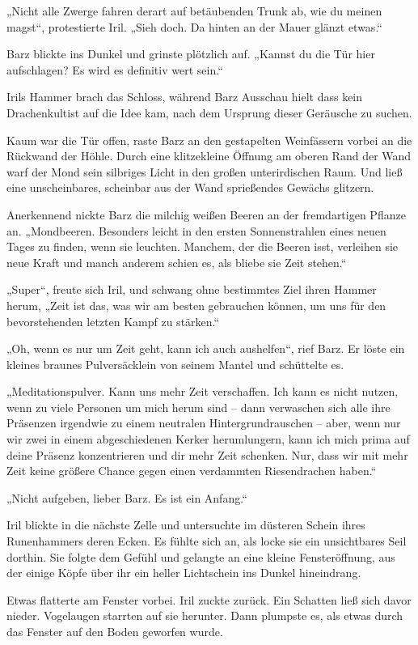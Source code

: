„Nicht alle Zwerge fahren derart auf betäubenden Trunk ab, wie du meinen magst“, protestierte Iril. „Sieh doch. Da hinten an der Mauer glänzt etwas.“

Barz blickte ins Dunkel und grinste plötzlich auf. „Kannst du die Tür hier aufschlagen? Es wird es definitiv wert sein.“

Irils Hammer brach das Schloss, während Barz Ausschau hielt dass kein Drachenkultist auf die Idee kam, nach dem Ursprung dieser Geräusche zu suchen.

Kaum war die Tür offen, raste Barz an den gestapelten Weinfässern vorbei an die Rückwand der Höhle. Durch eine klitzekleine Öffnung am oberen Rand der Wand warf der Mond sein silbriges Licht in den großen unterirdischen Raum. Und ließ eine unscheinbares, scheinbar aus der Wand sprießendes Gewächs glitzern.

Anerkennend nickte Barz die milchig weißen Beeren an der fremdartigen Pflanze an. „Mondbeeren. Besonders leicht in den ersten Sonnenstrahlen eines neuen Tages zu finden, wenn sie leuchten. Manchem, der die Beeren isst, verleihen sie neue Kraft und manch anderem schien es, als bliebe sie Zeit stehen.“

„Super“, freute sich Iril, und schwang ohne bestimmtes Ziel ihren Hammer herum, „Zeit ist das, was wir am besten gebrauchen können, um uns für den bevorstehenden letzten Kampf zu stärken.“

„Oh, wenn es nur um Zeit geht, kann ich auch aushelfen“, rief Barz. Er löste ein kleines braunes Pulversäcklein von seinem Mantel und schüttelte es.

„Meditationspulver. Kann uns mehr Zeit verschaffen. Ich kann es nicht nutzen, wenn zu viele Personen um mich herum sind – dann verwaschen sich alle ihre Präsenzen irgendwie zu einem neutralen Hintergrundrauschen – aber, wenn nur wir zwei in einem abgeschiedenen Kerker herumlungern, kann ich mich prima auf deine Präsenz konzentrieren und dir mehr Zeit schenken. Nur, dass wir mit mehr Zeit keine größere Chance gegen einen verdammten Riesendrachen haben.“

„Nicht aufgeben, lieber Barz. Es ist ein Anfang.“

Iril blickte in die nächste Zelle und untersuchte im düsteren Schein ihres Runenhammers deren Ecken. Es fühlte sich an, als locke sie ein unsichtbares Seil dorthin. Sie folgte dem Gefühl und gelangte an eine kleine Fensteröffnung, aus der einige Köpfe über ihr ein heller Lichtschein ins Dunkel hineindrang.

Etwas flatterte am Fenster vorbei. Iril zuckte zurück. Ein Schatten ließ sich davor nieder. Vogelaugen starrten auf sie herunter. Dann plumpste es, als etwas durch das Fenster auf den Boden geworfen wurde.

